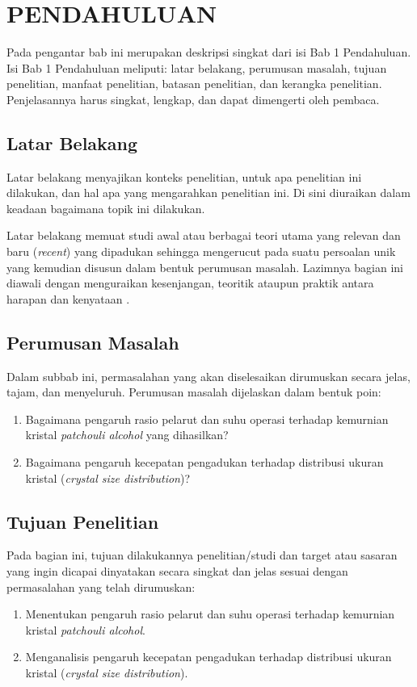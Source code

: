 \documentclass[skripsi,laporan]{itkta2025}
\begin{document}
\chapter{PENDAHULUAN}
Pada pengantar bab ini merupakan deskripsi singkat dari isi Bab 1 Pendahuluan. Isi Bab 1 Pendahuluan meliputi: latar belakang, perumusan masalah, tujuan penelitian, manfaat penelitian, batasan penelitian, dan kerangka penelitian. Penjelasannya harus singkat, lengkap, dan dapat dimengerti oleh pembaca.

\section{Latar Belakang}
Latar belakang menyajikan konteks penelitian, untuk apa penelitian ini dilakukan, dan hal apa yang mengarahkan penelitian ini. Di sini diuraikan dalam keadaan bagaimana topik ini dilakukan.

Latar belakang memuat studi awal atau berbagai teori utama yang relevan dan baru (\textit{recent}) yang dipadukan sehingga mengerucut pada suatu persoalan unik yang kemudian disusun dalam bentuk perumusan masalah. Lazimnya bagian ini diawali dengan menguraikan kesenjangan, teoritik ataupun praktik antara harapan dan kenyataan \citep{harunsyah2021, alzoubi2023}.

\section{Perumusan Masalah}
Dalam subbab ini, permasalahan yang akan diselesaikan dirumuskan secara jelas, tajam, dan menyeluruh. Perumusan masalah dijelaskan dalam bentuk poin:
\begin{enumerate}[label=\arabic*.]
  \item Bagaimana pengaruh rasio pelarut dan suhu operasi terhadap kemurnian kristal \textit{patchouli alcohol} yang dihasilkan?
  \item Bagaimana pengaruh kecepatan pengadukan terhadap distribusi ukuran kristal (\textit{crystal size distribution})?
\end{enumerate}

\section{Tujuan Penelitian}
Pada bagian ini, tujuan dilakukannya penelitian/studi dan target atau sasaran yang ingin dicapai dinyatakan secara singkat dan jelas sesuai dengan permasalahan yang telah dirumuskan:
\begin{enumerate}[label=\arabic*.]
  \item Menentukan pengaruh rasio pelarut dan suhu operasi terhadap kemurnian kristal \textit{patchouli alcohol}.
  \item Menganalisis pengaruh kecepatan pengadukan terhadap distribusi ukuran kristal (\textit{crystal size distribution}).
\end{enumerate}
\end{document}
